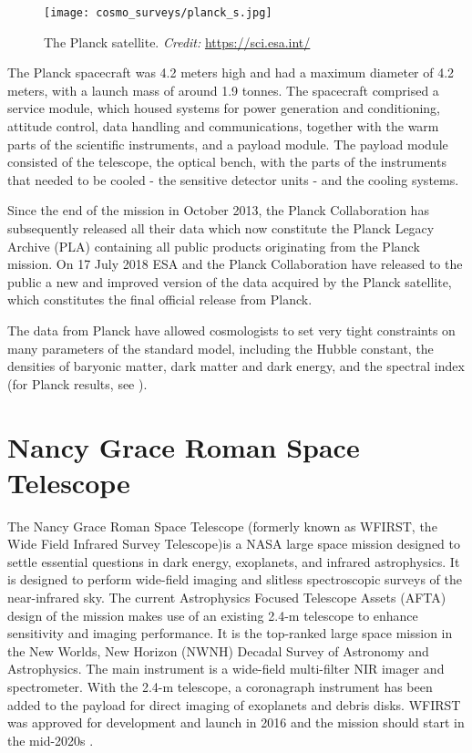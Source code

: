 \begin{figure}[htb]
    \centering
    \texttt{[image: cosmo\_surveys/planck\_s.jpg]}
    \caption{The Planck satellite. \textit{Credit:} \url{https://sci.esa.int/}}
    \label{fig:planck}
\end{figure}
The Planck spacecraft was 4.2 meters high and had a maximum diameter of 4.2 meters, with a launch mass of around 1.9 tonnes. The spacecraft comprised a service module, which housed systems for power generation and conditioning, attitude control, data handling and communications, together with the warm parts of the scientific instruments, and a payload module. The payload module consisted of the telescope, the optical bench, with the parts of the instruments that needed to be cooled - the sensitive detector units - and the cooling systems.

Since the end of the mission in October 2013, the Planck Collaboration has subsequently released all their data which now constitute the Planck Legacy Archive (PLA) containing all public products originating from the Planck mission. On 17 July 2018 ESA and the Planck Collaboration have released to the public a new and improved version of the data acquired by the Planck satellite, which constitutes the final official release from Planck.

The data from Planck have allowed cosmologists to set very tight constraints on many parameters of the standard model, including the Hubble constant, the densities of baryonic matter, dark matter and dark energy, and the spectral index (for Planck results, see \cite{planck_cosm}).
\section{Nancy Grace Roman Space Telescope}
The Nancy Grace Roman Space Telescope (formerly known as WFIRST, the Wide Field Infrared Survey Telescope)is a NASA large space mission designed to settle essential questions in dark energy, exoplanets, and infrared astrophysics. It is designed to perform wide-field imaging and slitless spectroscopic surveys of the near-infrared sky. The current Astrophysics Focused Telescope Assets (AFTA) design of the mission makes use of an existing 2.4-m telescope to enhance sensitivity and imaging performance. It is the top-ranked large space mission in the New Worlds, New Horizon (NWNH) Decadal Survey of Astronomy and Astrophysics. The main instrument is a wide-field multi-filter NIR imager and spectrometer. With the 2.4-m telescope, a coronagraph instrument has been added to the payload for direct imaging of exoplanets and debris disks. WFIRST was approved for development and launch in 2016 and the mission should start in the mid-2020s \cite{WFIRST_report}.

